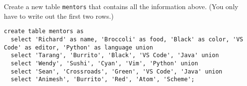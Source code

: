 \question Create a new table \lstinline$mentors$ that contains all the information above.
(You only have to write out the first two rows.)

\begin{solution}[1in]
\begin{lstlisting}
create table mentors as
  select 'Richard' as name, 'Broccoli' as food, 'Black' as color, 'VS Code' as editor, 'Python' as language union
  select 'Tarang', 'Burrito', 'Black', 'VS Code', 'Java' union
  select 'Wendy', 'Sushi', 'Cyan', 'Vim', 'Python' union
  select 'Sean', 'Crossroads', 'Green', 'VS Code', 'Java' union
  select 'Animesh', 'Burrito', 'Red', 'Atom', 'Scheme';
\end{lstlisting}
\end{solution}
